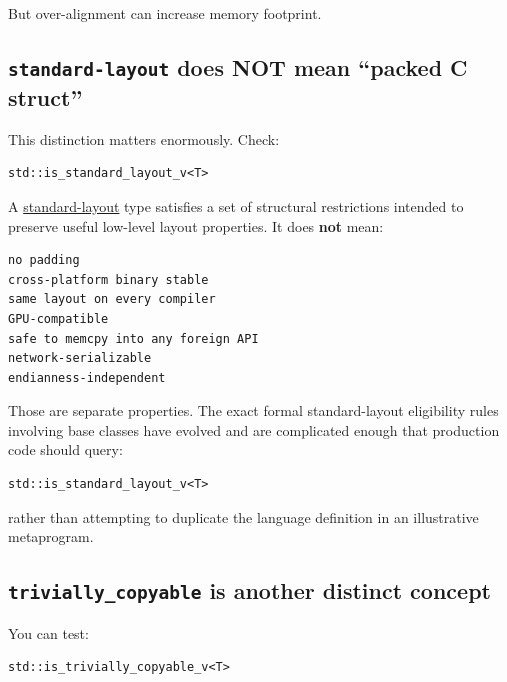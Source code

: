 But over-alignment can increase memory footprint.

\subsection{\texorpdfstring{\texttt{standard-layout} does NOT mean ``packed C struct''}{standard-layout does NOT mean ``packed C struct''}}\label{01-foundations-i-ch003-standard-layout-does-not-mean-packed-c-struct}

\hypertarget{01-foundations-i-ch003-standard-layout-does-not-mean-packed-c-struct}{}

This distinction matters enormously. Check:

\begin{verbatim}
std::is_standard_layout_v<T>
\end{verbatim}

A \hyperref[appendix-958870a64c53]{standard-layout} type satisfies a set of structural restrictions intended to preserve useful low-level layout properties. It does \textbf{not} mean:

\begin{verbatim}
no padding
cross-platform binary stable
same layout on every compiler
GPU-compatible
safe to memcpy into any foreign API
network-serializable
endianness-independent
\end{verbatim}

Those are separate properties. The exact formal standard-layout eligibility rules involving base classes have evolved and are complicated enough that production code should query:

\begin{verbatim}
std::is_standard_layout_v<T>
\end{verbatim}

rather than attempting to duplicate the language definition in an illustrative metaprogram.

\subsection{\texorpdfstring{\texttt{trivially\_copyable} is another distinct concept}{trivially\_copyable is another distinct concept}}\label{01-foundations-i-ch003-trivially_copyable-is-another-distinct-concept}

\hypertarget{01-foundations-i-ch003-trivially_copyable-is-another-distinct-concept}{}

You can test:

\begin{verbatim}
std::is_trivially_copyable_v<T>
\end{verbatim}

